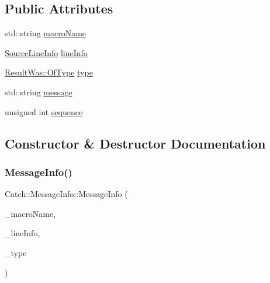 \subsection*{Public Attributes}
\begin{DoxyCompactItemize}
\item 
std\+::string \hyperlink{struct_catch_1_1_message_info_a156ade4b3cc731f6ec7b542ae47ba8e3}{macro\+Name}
\item 
\hyperlink{struct_catch_1_1_source_line_info}{Source\+Line\+Info} \hyperlink{struct_catch_1_1_message_info_a985165328723e599696ebd8e43195cc5}{line\+Info}
\item 
\hyperlink{struct_catch_1_1_result_was_a624e1ee3661fcf6094ceef1f654601ef}{Result\+Was\+::\+Of\+Type} \hyperlink{struct_catch_1_1_message_info_ae928b9117465c696e45951d9d0284e78}{type}
\item 
std\+::string \hyperlink{struct_catch_1_1_message_info_ab6cd06e050bf426c6577502a5c50e256}{message}
\item 
unsigned int \hyperlink{struct_catch_1_1_message_info_a7f4f57ea21e50160adefce7b68a781d6}{sequence}
\end{DoxyCompactItemize}


\subsection{Constructor \& Destructor Documentation}
\hypertarget{struct_catch_1_1_message_info_a2e336c33ebef7af3c1bbae6a56e14f8a}{}\label{struct_catch_1_1_message_info_a2e336c33ebef7af3c1bbae6a56e14f8a} 
\subsubsection{\texorpdfstring{Message\+Info()}{MessageInfo()}}
{\footnotesize\ttfamily Catch\+::\+Message\+Info\+::\+Message\+Info (\begin{DoxyParamCaption}\item[{std\+::string const \&}]{\+\_\+macro\+Name,  }\item[{\hyperlink{struct_catch_1_1_source_line_info}{Source\+Line\+Info} const \&}]{\+\_\+line\+Info,  }\item[{\hyperlink{struct_catch_1_1_result_was_a624e1ee3661fcf6094ceef1f654601ef}{Result\+Was\+::\+Of\+Type}}]{\+\_\+type }\end{DoxyParamCaption})}



